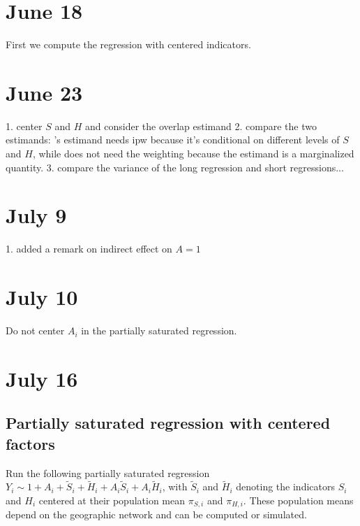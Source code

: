 \documentclass{article}
\newcommand{\tS}{\tilde{S}}
\newcommand{\tH}{\tilde{H}}
\begin{document}
\section{June 18}
First we compute the regression with centered indicators.  


\section{June 23}
1. center $S$ and $H$ and consider the overlap estimand
2. compare the two estimands: \cite{aronow2017estimating}'s estimand needs ipw because it's conditional on different levels of $S$ and $H$, while \cite{hudgens2008toward} does not need the weighting because the estimand is a marginalized quantity.
3. compare the variance of the long regression and short regressions...
 

\section{July 9}
1. added a remark on indirect effect on $A=1$


\section{July 10}
Do not center $A_i$ in the partially saturated regression.

\section{July 16}
\subsection{Partially saturated regression with centered factors}
Run the following partially saturated regression $Y_i \sim 1+A_i + \tS_i + \tH_i + A_i\tS_i + A_i \tH_i $, with $\tS_i$ and $\tH_i$ denoting the indicators $S_i$ and $H_i$ centered at their population mean $\pi_{S,i}$ and $\pi_{H,i}$. These population means depend on the geographic network and can be computed or simulated. 
\end{document}
